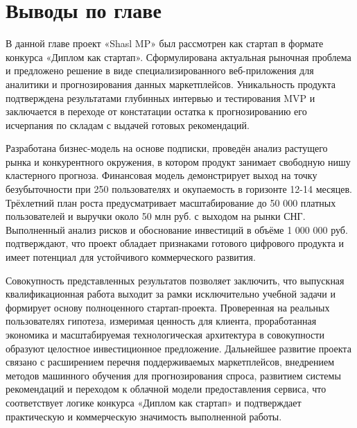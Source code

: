 \section{Выводы по главе}

В данной главе проект «Shasl MP» был рассмотрен как стартап в формате конкурса «Диплом как стартап». Сформулирована актуальная рыночная проблема и предложено решение в виде специализированного веб-приложения для аналитики и прогнозирования данных маркетплейсов. Уникальность продукта подтверждена результатами глубинных интервью и тестирования MVP и заключается в переходе от констатации остатка к прогнозированию его исчерпания по складам с выдачей готовых рекомендаций.

Разработана бизнес-модель на основе подписки, проведён анализ растущего рынка и конкурентного окружения, в котором продукт занимает свободную нишу кластерного прогноза. Финансовая модель демонстрирует выход на точку безубыточности при 250 пользователях и окупаемость в горизонте 12-14 месяцев. Трёхлетний план роста предусматривает масштабирование до 50 000 платных пользователей и выручки около 50 млн руб. с выходом на рынки СНГ. Выполненный анализ рисков и обоснование инвестиций в объёме 1 000 000 руб. подтверждают, что проект обладает признаками готового цифрового продукта и имеет потенциал для устойчивого коммерческого развития.

Совокупность представленных результатов позволяет заключить, что выпускная квалификационная работа выходит за рамки исключительно учебной задачи и формирует основу полноценного стартап-проекта. Проверенная на реальных пользователях гипотеза, измеримая ценность для клиента, проработанная экономика и масштабируемая технологическая архитектура в совокупности образуют целостное инвестиционное предложение. Дальнейшее развитие проекта связано с расширением перечня поддерживаемых маркетплейсов, внедрением методов машинного обучения для прогнозирования спроса, развитием системы рекомендаций и переходом к облачной модели предоставления сервиса, что соответствует логике конкурса «Диплом как стартап» и подтверждает практическую и коммерческую значимость выполненной работы.

